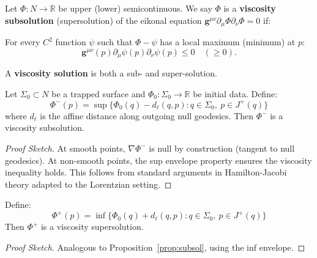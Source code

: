 \begin{definition}\label{def:viscosity}
Let $\Phi: N \to \mathbb{R}$ be upper (lower) semicontinuous. We say $\Phi$ is a \textbf{viscosity subsolution} (supersolution) of the eikonal equation $\mathbf{g}^{\mu\nu}\partial_\mu\Phi\partial_\nu\Phi = 0$ if:

For every $C^2$ function $\psi$ such that $\Phi - \psi$ has a local maximum (minimum) at $p$:
\begin{equation}
    \mathbf{g}^{\mu\nu}(p)\partial_\mu\psi(p)\partial_\nu\psi(p) \leq 0 \quad (\geq 0).
\end{equation}

A \textbf{viscosity solution} is both a sub- and super-solution.
\end{definition}

\begin{proposition}\label{prop:subsol}
Let $\Sigma_0 \subset N$ be a trapped surface and $\Phi_0: \Sigma_0 \to \mathbb{R}$ be initial data. Define:
\begin{equation}
    \Phi^-(p) = \sup\{\Phi_0(q) - d_\ell(q, p) : q \in \Sigma_0, \ p \in J^+(q)\}
\end{equation}
where $d_\ell$ is the affine distance along outgoing null geodesics. Then $\Phi^-$ is a viscosity subsolution.
\end{proposition}

\begin{proof}[Proof Sketch]
At smooth points, $\nabla\Phi^-$ is null by construction (tangent to null geodesics). At non-smooth points, the sup envelope property ensures the viscosity inequality holds. This follows from standard arguments in Hamilton-Jacobi theory adapted to the Lorentzian setting.
\end{proof}

\begin{proposition}\label{prop:supersol}
Define:
\begin{equation}
    \Phi^+(p) = \inf\{\Phi_0(q) + d_\ell(q, p) : q \in \Sigma_0, \ p \in J^+(q)\}
\end{equation}
Then $\Phi^+$ is a viscosity supersolution.
\end{proposition}

\begin{proof}[Proof Sketch]
Analogous to Proposition~\ref{prop:subsol}, using the inf envelope.
\end{proof}

